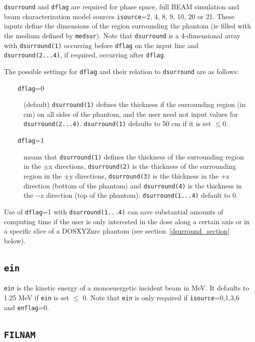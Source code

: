 \documentclass[12pt,twoside]{article}      %
\newcommand{\indexm}[1]{\index{#1}}
\begin{document}
{\tt dsurround} and {\tt dflag} are required for phase space, full
BEAM simulation and
beam characterization model sources {\tt isource}=2, 4, 8, 9, 10, 20 or 21.
These inputs define the dimensions of the region surrounding the phantom
(ie filled with the medium defined by {\tt medsur}).  Note that
{\tt dsurround} is a 4-dimensional array
with {\tt dsurround(1)} occurring before {\tt dflag} on the input line
and {\tt dsurround(2...4)}, if required, occurring after {\tt dflag}.

The possible settings for {\tt dflag} and their relation to {\tt dsurround}
are as follows:

\begin{description}

\item [~~~~{\tt dflag}=0] (default) {\tt dsurround(1)} defines the thickness
if the surrounding region (in cm) on all sides of the phantom, and the user
need not
input values for {\tt dsurround(2...4)}.  {\tt dsurround(1)}
defaults to 50 cm if it is set $\leq$0.
\item [~~~~{\tt dflag}=1] means that {\tt dsurround(1)} defines the thickness of the
surrounding region in the $\pm$x directions, {\tt dsurround(2)} is the
thickness of the surrounding region in the $\pm$y directions, {\tt dsurround(3)}
is the thickness in the +z direction (bottom of the phantom)
and {\tt dsurround(4)} is the thickness
in the $-$z direction (top of the phantom).  {\tt dsurround(1...4)} default to 0.
\end{description}

Use of {\tt dflag}=1 with {\tt dsurround(1...4)} can save substantial amounts of
computing time if the user is only interested in the dose along a certain axis
or in a specific slice of a DOSXYZnrc phantom (see section~\ref{dsurround_section}
below).

\subsection{{\tt ein}}
\indexm{ein}

{\tt ein} is the kinetic energy of
a monoenergetic incident beam in MeV.  It defaults to 1.25 MeV if
{\tt ein} is set $\leq$ 0.  Note that {\tt ein} is only required if
{\tt isource}=0,1,3,6 and {\tt enflag}=0.

\subsection{{\tt FILNAM}}
\indexm{FILNAM}
\end{document}
